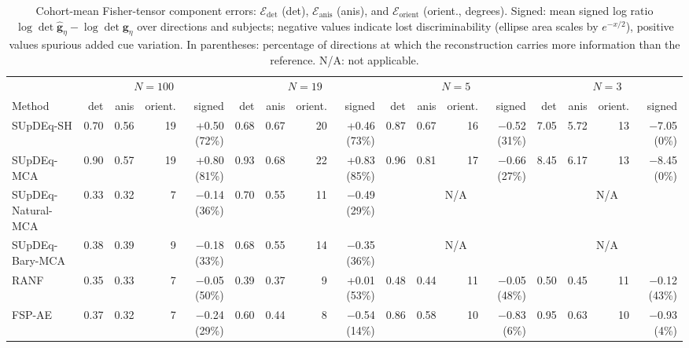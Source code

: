 \begin{table}[!t]
\centering
\caption{Cohort-mean Fisher-tensor component errors: \(\mathcal E_{\mathrm{det}}\) (det), \(\mathcal E_{\mathrm{anis}}\) (anis), and \(\mathcal E_{\mathrm{orient}}\) (orient., degrees). Signed: mean signed log ratio \(\log\det\widehat{\mathbf g}_\eta-\log\det\mathbf g_\eta\) over directions and subjects; negative values indicate lost discriminability (ellipse area scales by \(e^{-x/2}\)), positive values spurious added cue variation. In parentheses: percentage of directions at which the reconstruction carries more information than the reference. N/A: not applicable.}
\label{tab:tensor_component_means}
\scriptsize
\setlength{\tabcolsep}{2.4pt}
\begin{tabular}{lrrrrrrrrrrrrrrrr}
\toprule
 & \multicolumn{4}{c}{\(N=100\)} & \multicolumn{4}{c}{\(N=19\)} & \multicolumn{4}{c}{\(N=5\)} & \multicolumn{4}{c}{\(N=3\)} \\
\cmidrule(lr){2-5} \cmidrule(lr){6-9} \cmidrule(lr){10-13} \cmidrule(lr){14-17}
Method & det & anis & orient. & signed & det & anis & orient. & signed & det & anis & orient. & signed & det & anis & orient. & signed \\
\midrule
SUpDEq-SH & 0.70 & 0.56 & 19 & +0.50 (72\%) & 0.68 & 0.67 & 20 & +0.46 (73\%) & 0.87 & 0.67 & 16 & \(-\)0.52 (31\%) & 7.05 & 5.72 & 13 & \(-\)7.05 (0\%) \\
SUpDEq-MCA & 0.90 & 0.57 & 19 & +0.80 (81\%) & 0.93 & 0.68 & 22 & +0.83 (85\%) & 0.96 & 0.81 & 17 & \(-\)0.66 (27\%) & 8.45 & 6.17 & 13 & \(-\)8.45 (0\%) \\
SUpDEq-Natural-MCA & 0.33 & 0.32 & 7 & \(-\)0.14 (36\%) & 0.70 & 0.55 & 11 & \(-\)0.49 (29\%) & \multicolumn{4}{c}{N/A} & \multicolumn{4}{c}{N/A} \\
SUpDEq-Bary-MCA & 0.38 & 0.39 & 9 & \(-\)0.18 (33\%) & 0.68 & 0.55 & 14 & \(-\)0.35 (36\%) & \multicolumn{4}{c}{N/A} & \multicolumn{4}{c}{N/A} \\
RANF & 0.35 & 0.33 & 7 & \(-\)0.05 (50\%) & 0.39 & 0.37 & 9 & +0.01 (53\%) & 0.48 & 0.44 & 11 & \(-\)0.05 (48\%) & 0.50 & 0.45 & 11 & \(-\)0.12 (43\%) \\
FSP-AE & 0.37 & 0.32 & 7 & \(-\)0.24 (29\%) & 0.60 & 0.44 & 8 & \(-\)0.54 (14\%) & 0.86 & 0.58 & 10 & \(-\)0.83 (6\%) & 0.95 & 0.63 & 10 & \(-\)0.93 (4\%) \\
\bottomrule
\end{tabular}
\end{table}
